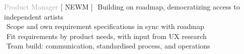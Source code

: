 
    
\begin{cvtable}


{\textcolor{darkgray}{Product Manager}}%
{[ {N\scriptsize EWM} ]}%
{%
     \textperiodcentered $ $ Building on roadmap, democratizing access to independent artists \\
     \textperiodcentered $ $ Scope and own requirement specifications in sync with roadmap \\
     \textperiodcentered $ $ Fit requirements by product needs, with input from UX research \\
     \textperiodcentered $ $ Team build: communication, standardised process, and operations \\
}




\end{cvtable}
